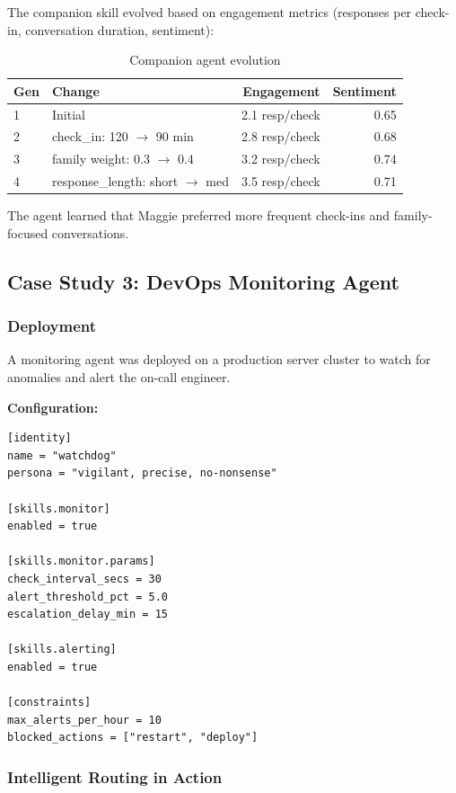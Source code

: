 \documentclass{article}
\begin{document}
The companion skill evolved based on engagement metrics (responses per check-in, conversation duration, sentiment):

\begin{table}[h]
\centering
\caption{Companion agent evolution}
\label{tab:companion_evolution}
\begin{tabular}{llrr}
\toprule
\textbf{Gen} & \textbf{Change} & \textbf{Engagement} & \textbf{Sentiment} \\
\midrule
1 & Initial & 2.1 resp/check & 0.65 \\
2 & check\_in: 120 $\to$ 90 min & 2.8 resp/check & 0.68 \\
3 & family weight: 0.3 $\to$ 0.4 & 3.2 resp/check & 0.74 \\
4 & response\_length: short $\to$ med & 3.5 resp/check & 0.71 \\
\bottomrule
\end{tabular}
\end{table}

The agent learned that Maggie preferred more frequent check-ins and family-focused conversations.

\subsection{Case Study 3: DevOps Monitoring Agent}

\subsubsection{Deployment}

A monitoring agent was deployed on a production server cluster to watch for anomalies and alert the on-call engineer.

\textbf{Configuration:}
\begin{lstlisting}[style=tomlcode]
[identity]
name = "watchdog"
persona = "vigilant, precise, no-nonsense"

[skills.monitor]
enabled = true

[skills.monitor.params]
check_interval_secs = 30
alert_threshold_pct = 5.0
escalation_delay_min = 15

[skills.alerting]
enabled = true

[constraints]
max_alerts_per_hour = 10
blocked_actions = ["restart", "deploy"]
\end{lstlisting}

\subsubsection{Intelligent Routing in Action}
\end{document}
